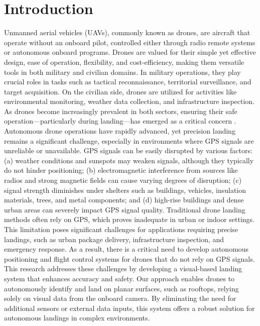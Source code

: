 \documentclass[unnumsec,webpdf,modern,large]{mam-authoring-template}%
\begin{document}
\section{Introduction}
Unmanned aerial vehicles (UAVs), commonly known as drones, are aircraft that operate without an onboard pilot, controlled either through radio remote systems or autonomous onboard programs. Drones are valued for their simple yet effective design, ease of operation, flexibility, and cost-efficiency, making them versatile tools in both military and civilian domains. In military operations, they play crucial roles in tasks such as tactical reconnaissance, territorial surveillance, and target acquisition. 
On the civilian side, drones are utilized for activities like environmental monitoring, weather data collection, and infrastructure inspection. As drones become increasingly prevalent in both sectors, ensuring their safe operation—particularly during landing—has emerged as a critical concern .\\Autonomous drone operations have rapidly advanced, yet precision landing remains a significant challenge, especially in environments where GPS signals are unreliable or unavailable. GPS signals can be easily disrupted by various factors: (a) weather conditions and sunspots may weaken signals, although they typically do not hinder positioning; (b) electromagnetic interference from sources like radios and strong magnetic fields can cause varying degrees of disruption; (c) signal strength diminishes under shelters such as buildings, vehicles, insulation materials, trees, and metal components; and (d) high-rise buildings and dense urban areas can severely impact GPS signal quality. Traditional drone landing methods often rely on GPS, which proves inadequate in urban or indoor settings. This limitation poses significant challenges for applications requiring precise landings, such as urban package delivery, infrastructure inspection, and emergency response. As a result, there is a critical need to develop autonomous positioning and flight control systems for drones that do not rely on GPS signals.\\
This research addresses these challenges by developing a visual-based landing system that enhances accuracy and safety. Our approach enables drones to autonomously identify and land on planar surfaces, such as rooftops, relying solely on visual data from the onboard camera. By eliminating the need for additional sensors or external data inputs, this system offers a robust solution for autonomous landings in complex environments.
\end{document}
